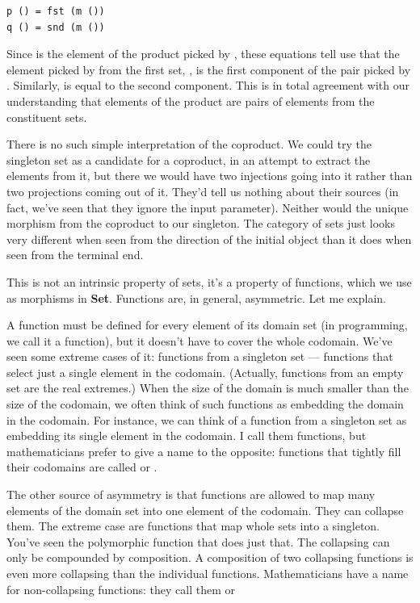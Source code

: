 \begin{Verbatim}[commandchars=\\\{\}]
p () = fst (m ())
q () = snd (m ())
\end{Verbatim}
Since  is the element of the product picked by ,
these equations tell use that the element picked by  from the
first set, , is the first component of the pair picked by
. Similarly,  is equal to the second component.
This is in total agreement with our understanding that elements of the
product are pairs of elements from the constituent sets.

There is no such simple interpretation of the coproduct. We could try
the singleton set as a candidate for a coproduct, in an attempt to
extract the elements from it, but there we would have two injections
going into it rather than two projections coming out of it. They'd tell
us nothing about their sources (in fact, we've seen that they ignore the
input parameter). Neither would the unique morphism from the coproduct
to our singleton. The category of sets just looks very different when
seen from the direction of the initial object than it does when seen
from the terminal end.

This is not an intrinsic property of sets, it's a property of functions,
which we use as morphisms in \textbf{Set}. Functions are, in general,
asymmetric. Let me explain.

A function must be defined for every element of its domain set (in
programming, we call it a  function), but it doesn't have to
cover the whole codomain. We've seen some extreme cases of it: functions
from a singleton set --- functions that select just a single element in
the codomain. (Actually, functions from an empty set are the real
extremes.) When the size of the domain is much smaller than the size of
the codomain, we often think of such functions as embedding the domain
in the codomain. For instance, we can think of a function from a
singleton set as embedding its single element in the codomain. I call
them  functions, but mathematicians prefer to give a
name to the opposite: functions that tightly fill their codomains are
called  or .

The other source of asymmetry is that functions are allowed to map many
elements of the domain set into one element of the codomain. They can
collapse them. The extreme case are functions that map whole sets into a
singleton. You've seen the polymorphic  function that does
just that. The collapsing can only be compounded by composition. A
composition of two collapsing functions is even more collapsing than the
individual functions. Mathematicians have a name for non-collapsing
functions: they call them  or 

